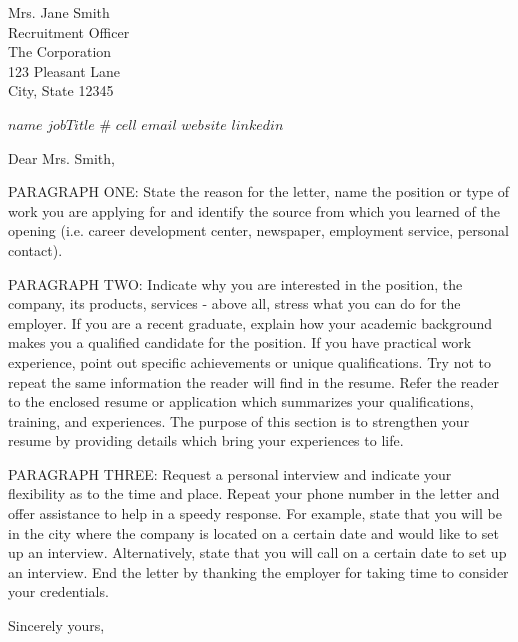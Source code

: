 \documentclass[11pt]{friggeri-cl}
\begin{document}
\begin{letter}{Mrs. Jane Smith \\
Recruitment Officer \\
The Corporation \\
123 Pleasant Lane \\
City, State 12345} 



\header
  {$name$}
  {$jobTitle$}
  {\# $cell$}
  {\href{mailto:$email$}{$email$}}
  {\href{$website$}{$website$}}
  {\href{$linkedin$}{$linkedin$}}



\signature{John Smith}



\opening{Dear Mrs. Smith,}



PARAGRAPH ONE: State the reason for the letter, name the position or type of
work you are applying for and identify the source from which you learned of the
opening (i.e. career development center, newspaper, employment service, personal
contact).

PARAGRAPH TWO: Indicate why you are interested in the position, the company, its
products, services - above all, stress what you can do for the employer. If you
are a recent graduate, explain how your academic background makes you a
qualified candidate for the position. If you have practical work experience,
point out specific achievements or unique qualifications. Try not to repeat the
same information the reader will find in the resume. Refer the reader to the
enclosed resume or application which summarizes your qualifications, training,
and experiences. The purpose of this section is to strengthen your resume by
providing details which bring your experiences to life.
 
PARAGRAPH THREE: Request a personal interview and indicate your flexibility as
to the time and place. Repeat your phone number in the letter and offer
assistance to help in a speedy response. For example, state that you will be in
the city where the company is located on a certain date and would like to set up
an interview. Alternatively, state that you will call on a certain date to set
up an interview. End the letter by thanking the employer for taking time to
consider your credentials.



\closing{Sincerely yours,}






\end{letter}
\end{document}
